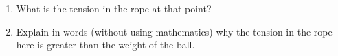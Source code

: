 \documentclass[12pt]{article}
\begin{document}
\begin{enumerate}
\begin{enumerate}
	\item What is the tension in the rope at that point?
	\item Explain in words (without using mathematics) why the tension in the rope here is greater than the weight of the ball.
\end{enumerate}
%
%
%
%
%
%
%
%

\end{enumerate}
\end{document}
